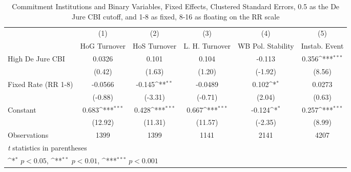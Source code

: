 \begin{table}[htbp]\centering
\def\sym#1{\ifmmode^{#1}\else\(^{#1}\)\fi}
\caption{Commitment Institutions and Binary Variables, Fixed Effects, Clustered Standard Errors, 0.5 as the De Jure CBI cutoff, and 1-8 as fixed, 8-16 as floating on the RR scale \label{binaryIndFEDJ}}
\begin{tabular}{l*{5}{c}}
\toprule
                                        &\multicolumn{1}{c}{(1)}&\multicolumn{1}{c}{(2)}&\multicolumn{1}{c}{(3)}&\multicolumn{1}{c}{(4)}&\multicolumn{1}{c}{(5)}\\
                                        &\multicolumn{1}{c}{HoG Turnover}&\multicolumn{1}{c}{HoS Turnover}&\multicolumn{1}{c}{L. H. Turnover}&\multicolumn{1}{c}{WB Pol. Stability}&\multicolumn{1}{c}{Instab. Event}\\
\midrule
High De Jure CBI                        &   0.0326         &    0.101         &    0.104         &   -0.113         &    0.356\sym{***}\\
                                        &   (0.42)         &   (1.63)         &   (1.20)         &  (-1.92)         &   (8.56)         \\
\addlinespace
Fixed Rate (RR 1-8)                     &  -0.0566         &   -0.145\sym{**} &  -0.0489         &    0.102\sym{*}  &   0.0273         \\
                                        &  (-0.88)         &  (-3.31)         &  (-0.71)         &   (2.04)         &   (0.63)         \\
\addlinespace
Constant                                &    0.683\sym{***}&    0.428\sym{***}&    0.667\sym{***}&   -0.124\sym{*}  &    0.257\sym{***}\\
                                        &  (12.92)         &  (11.31)         &  (11.57)         &  (-2.35)         &   (8.99)         \\
\midrule
Observations                            &     1399         &     1399         &     1141         &     2141         &     4207         \\
\bottomrule
\multicolumn{6}{l}{\footnotesize \textit{t} statistics in parentheses}\\
\multicolumn{6}{l}{\footnotesize \sym{*} \(p<0.05\), \sym{**} \(p<0.01\), \sym{***} \(p<0.001\)}\\
\end{tabular}
\end{table}

